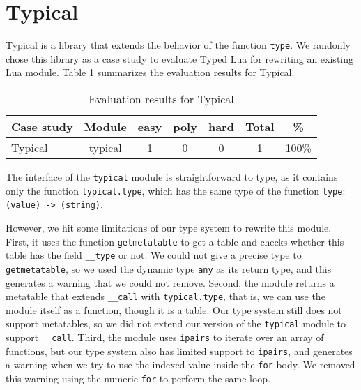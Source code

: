 \section{Typical}

Typical \citep{luatypical} is a library that extends the behavior of the
function \texttt{type}. 
We randonly chose this library as a case study to evaluate Typed Lua
for rewriting an existing Lua module.
Table \ref{tab:evaltypical} summarizes the evaluation results for Typical.

\begin{table}[!ht]
\begin{center}
\begin{tabular}{|l|c|c|c|c|c|c|}
\hline
\textbf{Case study} & \textbf{Module} & \textbf{easy} & \textbf{poly} & \textbf{hard} & \textbf{Total} & \textbf{\%} \\
\hline
\multirow{1}{*}{Typical}
& typical & 1 & 0 & 0 & 1 & 100\% \\
\hline
\end{tabular}
\end{center}
\caption{Evaluation results for Typical}
\label{tab:evaltypical}
\end{table}

The interface of the \texttt{typical} module is straightforward to type,
as it contains only the function \texttt{typical.type},
which has the same type of the function \texttt{type}: \texttt{(value) -> (string)}.

However, we hit some limitations of our type system to rewrite this module.
First, it uses the function \texttt{getmetatable} to get a table and
checks whether this table has the field \texttt{\string_\string_type} or not.
We could not give a precise type to \texttt{getmetatable}, so we used the dynamic
type \texttt{any} as its return type, and this generates a warning that we could not
remove.
Second, the module returns a metatable that extends \texttt{\string_\string_call}
with \texttt{typical.type}, that is, we can use the module itself as a function,
though it is a table.
Our type system still does not support metatables, so we did not extend our version
of the \texttt{typical} module to support \texttt{\string_\string_call}.
Third, the module uses \texttt{ipairs} to iterate over an array of functions,
but our type system also has limited support to \texttt{ipairs}, and generates
a warning when we try to use the indexed value inside the \texttt{for} body.
We removed this warning using the numeric \texttt{for} to perform the same loop.

